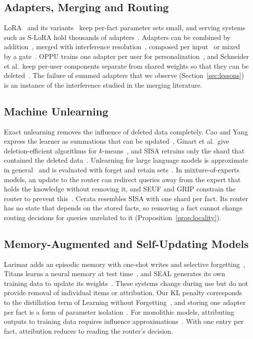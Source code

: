 \documentclass[journal,10pt]{IEEEtran}
\begin{document}
\subsection{Adapters, Merging and Routing}
LoRA~\cite{hu2022lora} and its variants~\cite{hayou2024loraplus,liu2024dora,
meng2024pissa,buyukakyuz2024olora} keep per-fact parameter sets small, and serving
systems such as S-LoRA hold thousands of adapters~\cite{sheng2024slora}. Adapters can be
combined by addition~\cite{ilharco2023taskarithmetic}, merged with interference
resolution~\cite{yadav2023ties}, composed per input~\cite{huang2024lorahub,
zhao2024loraretriever} or mixed by a gate~\cite{wu2024mole,shazeer2017moe}. OPPU trains
one adapter per user for personalization~\cite{tan2024oppu}, and Schneider et al.\ keep
per-user components separate from shared weights so that they can be
deleted~\cite{schneider2026separable}. The failure of summed adapters that we observe
(Section~\ref{sec:lessons}) is an instance of the interference studied in the merging
literature.

\subsection{Machine Unlearning}
Exact unlearning removes the influence of deleted data completely. Cao and Yang express
the learner as summations that can be updated~\cite{cao2015forget}, Ginart et al.\ give
deletion-efficient algorithms for $k$-means~\cite{ginart2019forget}, and SISA retrains
only the shard that contained the deleted data~\cite{bourtoule2021sisa}. Unlearning for
large language models is approximate in general~\cite{eldan2023harrypotter} and is
evaluated with forget and retain sets~\cite{maini2024tofu,shi2025muse,
liu2025rethinking}. In mixture-of-experts models, an update to the router can redirect
queries away from the expert that holds the knowledge without removing it, and SEUF and
GRIP constrain the router to prevent this~\cite{zhuang2025seuf,zhu2026grip}. Cerata
resembles SISA with one shard per fact. Its router has no state that depends on the stored facts, so removing a
fact cannot change routing decisions for queries unrelated to it
(Proposition~\ref{prop:locality}).

\subsection{Memory-Augmented and Self-Updating Models}
Larimar adds an episodic memory with one-shot writes and selective
forgetting~\cite{das2024larimar}, Titans learns a neural memory at test
time~\cite{behrouz2025titans}, and SEAL generates its own training data to update its
weights~\cite{zweiger2025seal}. These systems change during use but do not provide
removal of individual items or attribution. Our KL penalty corresponds to the
distillation term of Learning without Forgetting~\cite{li2018lwf}, and storing one
adapter per fact is a form of parameter isolation~\cite{rusu2016progressive}. For
monolithic models, attributing outputs to training data requires influence
approximations~\cite{koh2017influence,grosse2023influence}. With one entry per fact,
attribution reduces to reading the router's decision.
\end{document}
